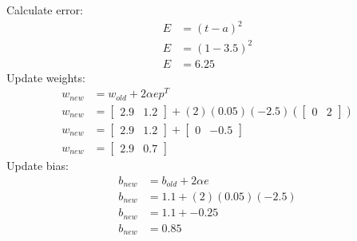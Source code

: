 \documentclass{article}
\begin{document}
	Calculate error: 
	\begin{equation}
		\begin{split}
			E & = (t - a)^2 \\
			E & = (1 - 3.5)^2 \\
			E & = 6.25
		\end{split}
	\end{equation}
	Update weights:
	\begin{equation}
		\begin{split}
			w_{new} & = w_{old} + 2 \alpha e p^T \\
			w_{new} & = \begin{bmatrix}
				2.9 & 1.2
			\end{bmatrix} + (2)(0.05)(-2.5) (\begin{bmatrix}
				0 & 2
			\end{bmatrix} ) \\
			w_{new} & = \begin{bmatrix}
				2.9 & 1.2
			\end{bmatrix} + \begin{bmatrix}
				0 & -0.5
			\end{bmatrix} \\
			w_{new} & = \begin{bmatrix}
				2.9 & 0.7
			\end{bmatrix}
		\end{split}
	\end{equation}
	Update bias:
	\begin{equation}
		\begin{split}
			b_{new} & = b_{old} + 2 \alpha e \\
			b_{new} & = 1.1 + (2)(0.05)(-2.5) \\
			b_{new} & = 1.1 + -0.25 \\
			b_{new} & = 0.85 \\
		\end{split}
	\end{equation}
\end{document}

